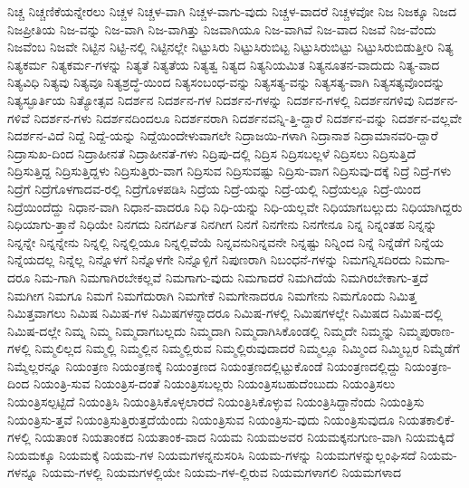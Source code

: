 {ನಿಚ್ಚ
ನಿಚ್ಚಣಿಕೆಯನ್ನೇರಲು
ನಿಚ್ಚಳ
ನಿಚ್ಚಳ-ವಾಗಿ
ನಿಚ್ಚಳ-ವಾಗು-ವುದು
ನಿಚ್ಚಳ-ವಾದರೆ
ನಿಚ್ಚಳವೋ
ನಿಜ
ನಿಜಕ್ಕೂ
ನಿಜದ
ನಿಜಪ್ರೀತಿಯ
ನಿಜ-ವನ್ನು
ನಿಜ-ವಾಗಿ
ನಿಜ-ವಾಗಿತ್ತು
ನಿಜವಾಗಿಯೂ
ನಿಜ-ವಾಗಿವೆ
ನಿಜ-ವಾದ
ನಿಜವೆ
ನಿಜ-ವೆಂದು
ನಿಜವೆಂಬ
ನಿಜವೇ
ನಿಟ್ಟಿನ
ನಿಟ್ಟಿ-ನಲ್ಲಿ
ನಿಟ್ಟಿನಲ್ಲೇ
ನಿಟ್ಟುಸಿರು
ನಿಟ್ಟುಸಿರುಬಿಟ್ಟ
ನಿಟ್ಟುಸಿರುಬಿಟ್ಟು
ನಿಟ್ಟುಸಿರುಬಿಡುತ್ತೀರಿ
ನಿತ್ಯ
ನಿತ್ಯಕರ್ಮ
ನಿತ್ಯಕರ್ಮ-ಗಳನ್ನು
ನಿತ್ಯತೆ
ನಿತ್ಯತೆಯ
ನಿತ್ಯತ್ವ
ನಿತ್ಯದ
ನಿತ್ಯನಿಯಮಿತ
ನಿತ್ಯನೂತನ-ವಾದುದು
ನಿತ್ಯ-ವಾದ
ನಿತ್ಯವಿಧಿ
ನಿತ್ಯವು
ನಿತ್ಯವೂ
ನಿತ್ಯಶ್ರದ್ಧೆ-ಯಿಂದ
ನಿತ್ಯಸಂಬಂಧ-ವನ್ನು
ನಿತ್ಯಸತ್ಯ-ವನ್ನು
ನಿತ್ಯಸತ್ಯ-ವಾಗಿ
ನಿತ್ಯಸತ್ಯವೊಂದನ್ನು
ನಿತ್ಯಸ್ಫೂರ್ತಿಯ
ನಿತ್ಯೋತ್ಸವ
ನಿದರ್ಶನ
ನಿದರ್ಶನ-ಗಳ
ನಿದರ್ಶನ-ಗಳನ್ನು
ನಿದರ್ಶನ-ಗಳಲ್ಲಿ
ನಿದರ್ಶನಗಳಿವು
ನಿದರ್ಶನ-ಗಳಿವೆ
ನಿದರ್ಶನ-ಗಳು
ನಿದರ್ಶನದಿಂದಲೂ
ನಿದರ್ಶನರಾಗಿ
ನಿದರ್ಶನವನ್ನಿ-ತ್ತಿ-ದ್ದಾರೆ
ನಿದರ್ಶನ-ವನ್ನು
ನಿದರ್ಶನ-ವಲ್ಲವೇ
ನಿದರ್ಶನ-ವಿದೆ
ನಿದ್ದೆ
ನಿದ್ದೆ-ಯನ್ನು
ನಿದ್ದೆಯಿಂದೇಳುವಾಗಲೇ
ನಿದ್ರಾಜಯಿ-ಗಳಾಗಿ
ನಿದ್ರಾನಾಶ
ನಿದ್ರಾಮಾನವರಿ-ದ್ದಾರೆ
ನಿದ್ರಾಸುಖ-ದಿಂದ
ನಿದ್ರಾಹೀನತೆ
ನಿದ್ರಾಹೀನತೆ-ಗಳು
ನಿದ್ರಿಪು-ದಲ್ಲಿ
ನಿದ್ರಿಸ
ನಿದ್ರಿಸಬಲ್ಲಳೆ
ನಿದ್ರಿಸಲು
ನಿದ್ರಿಸುತ್ತಿದೆ
ನಿದ್ರಿಸುತ್ತಿದ್ದ
ನಿದ್ರಿಸುತ್ತಿದ್ದಳು
ನಿದ್ರಿಸುತ್ತಿರು-ವಾಗ
ನಿದ್ರಿಸುವ
ನಿದ್ರಿಸುವಷ್ಟು
ನಿದ್ರಿಸು-ವಾಗ
ನಿದ್ರಿಸುವು-ದಕ್ಕೆ
ನಿದ್ರೆ
ನಿದ್ರೆ-ಗಳು
ನಿದ್ರೆಗೆ
ನಿದ್ರೆಗೊಳಗಾದವ-ರಲ್ಲಿ
ನಿದ್ರೆಗೊಳಪಡಿಸಿ
ನಿದ್ರೆಯ
ನಿದ್ರೆ-ಯನ್ನು
ನಿದ್ರೆ-ಯಲ್ಲಿ
ನಿದ್ರೆಯಲ್ಲೂ
ನಿದ್ರೆ-ಯಿಂದ
ನಿದ್ರೆಯಿಂದೆದ್ದು
ನಿಧಾನ-ವಾಗಿ
ನಿಧಾನ-ವಾದರೂ
ನಿಧಿ
ನಿಧಿ-ಯನ್ನು
ನಿಧಿ-ಯಲ್ಲವೇ
ನಿಧಿಯಾಗಬಲ್ಲುದು
ನಿಧಿಯಾಗಿದ್ದರು
ನಿಧಿಯಾಗು-ತ್ತಾನೆ
ನಿಧಿಯೇ
ನಿನಗದು
ನಿನಗರ್ಪಿತ
ನಿನಗೀಗ
ನಿನಗೆ
ನಿನಗೇನು
ನಿನಗೇನೂ
ನಿನ್ನ
ನಿನ್ನಂತಹ
ನಿನ್ನನ್ನು
ನಿನ್ನನ್ನೇ
ನಿನ್ನನ್ನೇನು
ನಿನ್ನಲ್ಲಿ
ನಿನ್ನಲ್ಲಿಯೂ
ನಿನ್ನಲ್ಲಿವೆಯೆ
ನಿನ್ನವನುನಿನ್ನವನೇ
ನಿನ್ನಷ್ಟು
ನಿನ್ನಿಂದ
ನಿನ್ನೆ
ನಿನ್ನೆಡೆಗೆ
ನಿನ್ನೆಯ
ನಿನ್ನೆಯದಲ್ಲ
ನಿನ್ನೆಲ್ಲ
ನಿನ್ನೊಳಗೆ
ನಿನ್ನೊಳಗೇ
ನಿನ್ನೊಳ್ಪಿಗೆ
ನಿಪುಣರಾಗಿ
ನಿಬಂಧನೆ-ಗಳನ್ನು
ನಿಮಗನ್ನಿಸದಿರದು
ನಿಮಗಾ-ದರೂ
ನಿಮ-ಗಾಗಿ
ನಿಮಗಾಗಿರಬೇಕಲ್ಲವೆ
ನಿಮಗಾಗು-ವುದು
ನಿಮಗಾದರೆ
ನಿಮಗಿದೆಯೆ
ನಿಮಗಿರಬೇಕಾಗು-ತ್ತದೆ
ನಿಮಗೀಗ
ನಿಮಗೂ
ನಿಮಗೆ
ನಿಮಗೆದುರಾಗಿ
ನಿಮಗೇಕೆ
ನಿಮಗೇನಾದರೂ
ನಿಮಗೇನು
ನಿಮಗೊಂದು
ನಿಮಿತ್ತ
ನಿಮಿತ್ತವಾಗಲು
ನಿಮಿಷ
ನಿಮಿಷ-ಗಳ
ನಿಮಿಷಗಳನ್ನಾದರೂ
ನಿಮಿಷ-ಗಳಲ್ಲಿ
ನಿಮಿಷಗಳಲ್ಲೇ
ನಿಮಿಷದ
ನಿಮಿಷ-ದಲ್ಲಿ
ನಿಮಿಷ-ದಲ್ಲೇ
ನಿಮ್ನ
ನಿಮ್ಮ
ನಿಮ್ಮದಾಗಬಲ್ಲದು
ನಿಮ್ಮದಾಗಿ
ನಿಮ್ಮದಾಗಿಸಿಕೊಂಡಲ್ಲಿ
ನಿಮ್ಮದೇ
ನಿಮ್ಮನ್ನು
ನಿಮ್ಮಪುರಾಣ-ಗಳಲ್ಲಿ
ನಿಮ್ಮಲಿಲ್ಲದ
ನಿಮ್ಮಲ್ಲಿ
ನಿಮ್ಮಲ್ಲಿನ
ನಿಮ್ಮಲ್ಲಿರುವ
ನಿಮ್ಮಲ್ಲಿರುವುದಾದರೆ
ನಿಮ್ಮಲ್ಲೂ
ನಿಮ್ಮಿಂದ
ನಿಮ್ಮಿಬ್ಬರ
ನಿಮ್ಮೆಡೆಗೆ
ನಿಮ್ಮೆಲ್ಲರನ್ನೂ
ನಿಯಂತ್ರಣ
ನಿಯಂತ್ರಣಕ್ಕೆ
ನಿಯಂತ್ರಣದ
ನಿಯಂತ್ರಣದಲ್ಲಿಟ್ಟುಕೊಂಡೆ
ನಿಯಂತ್ರಣದಲ್ಲಿದ್ದು
ನಿಯಂತ್ರಣ-ದಿಂದ
ನಿಯಂತ್ರಿ-ಸುವ
ನಿಯಂತ್ರಿಸ-ದಂತೆ
ನಿಯಂತ್ರಿಸಬಲ್ಲರು
ನಿಯಂತ್ರಿಸಬಹುದೆಂಬುದು
ನಿಯಂತ್ರಿಸಲು
ನಿಯಂತ್ರಿಸಲ್ಪಟ್ಟಿದೆ
ನಿಯಂತ್ರಿಸಿ
ನಿಯಂತ್ರಿಸಿಕೊಳ್ಳಲಾರದೆ
ನಿಯಂತ್ರಿಸಿಕೊಳ್ಳುವ
ನಿಯಂತ್ರಿಸಿದ್ದಾನೆಂದು
ನಿಯಂತ್ರಿಸು
ನಿಯಂತ್ರಿಸು-ತ್ತವೆ
ನಿಯಂತ್ರಿಸುತ್ತಿರುತ್ತದೆಯೆಂದು
ನಿಯಂತ್ರಿಸುವ
ನಿಯಂತ್ರಿಸು-ವುದು
ನಿಯಂತ್ರಿಸುವುದೂ
ನಿಯತಕಾಲಿಕೆ-ಗಳಲ್ಲಿ
ನಿಯತಾಂಕ
ನಿಯತಾಂಕದ
ನಿಯತಾಂಕ-ವಾದ
ನಿಯಮ
ನಿಯಮಅವರ
ನಿಯಮಕ್ಕನುಗುಣ-ವಾಗಿ
ನಿಯಮಕ್ಕಿದೆ
ನಿಯಮಕ್ಕೂ
ನಿಯಮಕ್ಕೆ
ನಿಯಮ-ಗಳ
ನಿಯಮಗಳನ್ನನುಸರಿಸಿ
ನಿಯಮ-ಗಳನ್ನು
ನಿಯಮಗಳನ್ನುಲ್ಲಂಘಿಸದೆ
ನಿಯಮ-ಗಳನ್ನೂ
ನಿಯಮ-ಗಳಲ್ಲಿ
ನಿಯಮಗಳಲ್ಲಿಯೇ
ನಿಯಮ-ಗಳ-ಲ್ಲಿರುವ
ನಿಯಮಗಳಾಗಲಿ
ನಿಯಮಗಳಾದ
}
